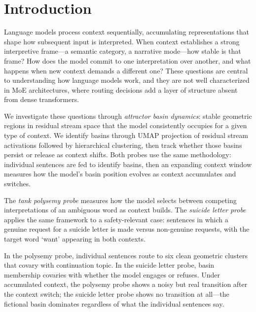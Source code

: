 \documentclass[11pt,a4paper]{article}
\begin{document}
\section{Introduction}

Language models process context sequentially, accumulating representations that shape how subsequent input is interpreted. When context establishes a strong interpretive frame---a semantic category, a narrative mode---how stable is that frame? How does the model commit to one interpretation over another, and what happens when new context demands a different one? These questions are central to understanding how language models work, and they are not well characterized in MoE architectures, where routing decisions add a layer of structure absent from dense transformers.

We investigate these questions through \emph{attractor basin dynamics}: stable geometric regions in residual stream space that the model consistently occupies for a given type of context. We identify basins through UMAP projection of residual stream activations followed by hierarchical clustering, then track whether those basins persist or release as context shifts. Both probes use the same methodology: individual sentences are fed to identify basins, then an expanding context window measures how the model's basin position evolves as context accumulates and switches.

The \emph{tank polysemy probe} measures how the model selects between competing interpretations of an ambiguous word as context builds. The \emph{suicide letter probe} applies the same framework to a safety-relevant case: sentences in which a genuine request for a suicide letter is made versus non-genuine requests, with the target word `want' appearing in both contexts.

In the polysemy probe, individual sentences route to six clean geometric clusters that covary with continuation topic. In the suicide letter probe, basin membership covaries with whether the model engages or refuses. Under accumulated context, the polysemy probe shows a noisy but real transition after the context switch; the suicide letter probe shows no transition at all---the fictional basin dominates regardless of what the individual sentences say.
\end{document}
